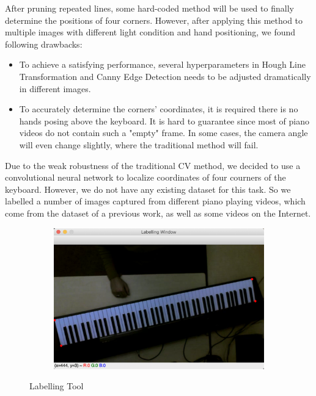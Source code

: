 \documentclass[10pt,twocolumn,letterpaper]{article}
\begin{document}
After pruning repeated lines, some hard-coded method will be used to finally determine the positions of four corners. However, after applying this method to multiple images with different light condition and hand positioning, we found following drawbacks:

\begin{itemize}
  \item To achieve a satisfying performance, several hyperparameters in Hough Line Transformation and Canny Edge Detection needs to be adjusted dramatically in different images.
  \item To accurately determine the corners' coordinates, it is required there is no hands posing above the keyboard. It is hard to guarantee since most of piano videos do not contain such a "empty" frame. In some cases, the camera angle will even change slightly, where the traditional method will fail.
\end{itemize}

Due to the weak robustness of the traditional CV method, we decided to use a convolutional neural network to localize coordinates of four courners of the keyboard. However, we do not have any existing dataset for this task. So we labelled a number of images captured from different piano playing videos, which come from the dataset of a previous work, as well as some videos on the Internet.

\begin{figure}[h!]
  \hspace{2.1cm}
  \begin{subfigure}{0.24\textwidth}
    \includegraphics[width=\linewidth]{fig/7.png}
  \end{subfigure}
  \caption{Labelling Tool}
\end{figure}
\end{document}
